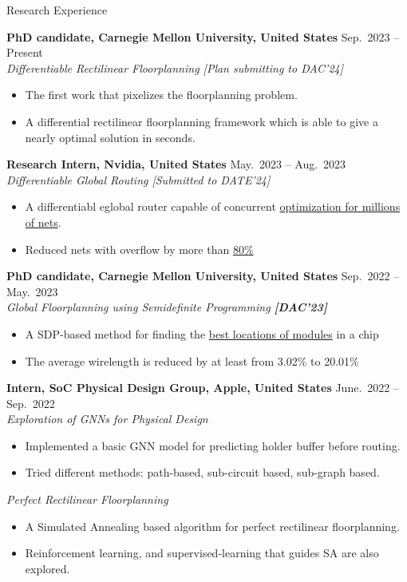 
\begin{rSection}{Research Experience}

    {\bf PhD candidate, Carnegie Mellon University, United States}               \hfill { Sep.~2023 -- Present} \\
    \textit{Differentiable Rectilinear Floorplanning [Plan submitting to DAC'24]}
    \begin{itemize}[noitemsep,topsep=-5pt]
        \item The first work that pixelizes the floorplanning problem.
        \item A differential rectilinear floorplanning framework which is able to give a nearly optimal solution in seconds.
    \end{itemize} 
    {\bf Research Intern, Nvidia, United States}               \hfill { May.~2023 -- Aug.~2023} \\
    \textit{Differentiable Global Routing [Submitted to DATE'24]}
    \begin{itemize}[noitemsep,topsep=-5pt]
        \item A differentiabl eglobal router capable of concurrent \underline{optimization for millions of nets}.
        \item Reduced nets with overflow by more than \underline{80\%} \\
    \end{itemize} 

    {\bf PhD candidate, Carnegie Mellon University, United States}               \hfill { Sep.~2022 -- May.~2023} \\
    \textit{Global Floorplanning using Semidefinite Programming \textbf{[{{DAC'23}}]}} 
    \begin{itemize}[noitemsep,topsep=-5pt]
        \item A SDP-based method for finding the \underline{best locations of modules} in a chip
        \item The average wirelength is reduced by at least from 3.02\% to 20.01\% \\
    \end{itemize} 

{\bf Intern, SoC Physical Design Group, Apple, United States}               \hfill { June.~2022 -- Sep.~2022} \\
\textit{Exploration of GNNs for Physical Design }
\begin{itemize}[noitemsep,topsep=-5pt]
    \item Implemented a basic GNN model for predicting holder buffer before routing.
    \item Tried different methods: path-based, sub-circuit based, sub-graph based.
\end{itemize}
\textit{Perfect Rectilinear Floorplanning}
\begin{itemize}[noitemsep,topsep=-5pt]
    \item A Simulated Annealing based algorithm for perfect rectilinear floorplanning.
    \item Reinforcement learning, and supervised-learning that guides SA are also explored.\\
\end{itemize}


\end{rSection}
